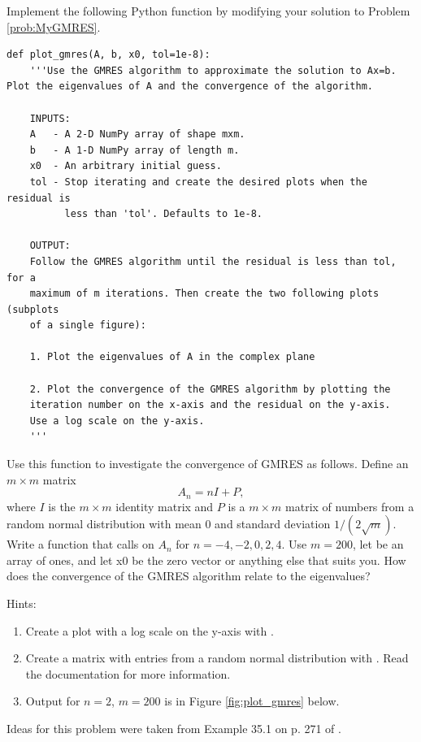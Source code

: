 \begin{problem}\label{prob:plot_gmres}
Implement the following Python function by modifying your solution to Problem \ref{prob:MyGMRES}.

\begin{lstlisting}
def plot_gmres(A, b, x0, tol=1e-8):
    '''Use the GMRES algorithm to approximate the solution to Ax=b. Plot the eigenvalues of A and the convergence of the algorithm.
    
    INPUTS:
    A   - A 2-D NumPy array of shape mxm.
    b   - A 1-D NumPy array of length m.
    x0  - An arbitrary initial guess.
    tol - Stop iterating and create the desired plots when the residual is
          less than 'tol'. Defaults to 1e-8.
    
    OUTPUT:
    Follow the GMRES algorithm until the residual is less than tol, for a 
    maximum of m iterations. Then create the two following plots (subplots
    of a single figure):
     
    1. Plot the eigenvalues of A in the complex plane
    
    2. Plot the convergence of the GMRES algorithm by plotting the
    iteration number on the x-axis and the residual on the y-axis.
    Use a log scale on the y-axis.
    '''
\end{lstlisting}

Use this function to investigate the convergence of GMRES as follows. 
Define an $m\times m$ matrix
\[A_n = nI+P,\]
 where $I$ is the $m \times m$ identity matrix and $P$ is a $m \times m$ matrix of numbers from a random normal distribution with mean 0 and standard deviation $1/(2\sqrt{m})$. 
 Write a function that calls  on $A_n$ for $n=-4,-2,0,2,4$. Use $m=200$, let  be an array of ones, and let x0 be the zero vector or anything else that suits you. How does the convergence of the GMRES algorithm relate to the eigenvalues?
 
 Hints:
 \begin{enumerate}
 \item Create a plot with a log scale on the y-axis with .
 \item Create a matrix with entries from a random normal distribution with .  Read the documentation for more information.
 \item Output for $n=2$, $m=200$ is in Figure \ref{fig:plot_gmres} below.
 \end{enumerate}
Ideas for this problem were taken from Example 35.1 on p. 271 of \cite{Trefethen1997}.
\end{problem}

